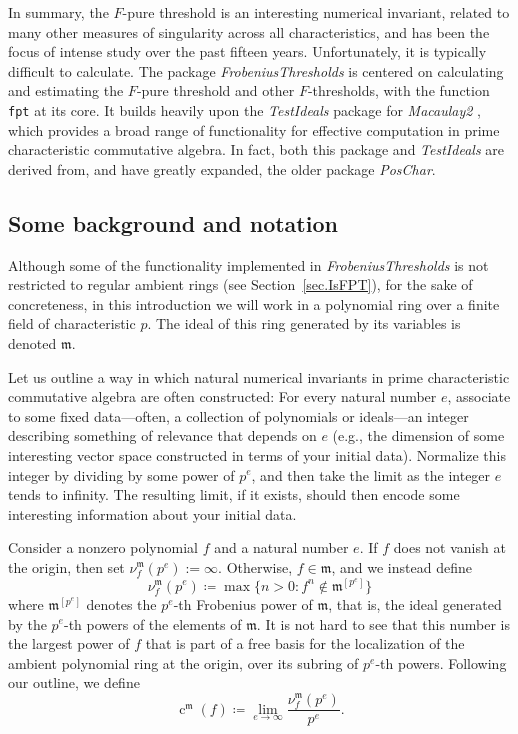 \documentclass{amsart}
\newcommand{\ft}{\operatorname{c}}
\newcommand{\idealm}{\mathfrak{m}}
\begin{document}
In summary,  the $F$-pure threshold is an interesting numerical invariant, related to many other measures of singularity across all characteristics, and has been the focus of intense study over the past fifteen years.
Unfortunately, it is typically difficult to calculate.
The package \emph{FrobeniusThresholds} is centered on calculating and estimating the $F$-pure threshold and other $F$-thresholds, with the function \texttt{fpt} at its core.
It builds heavily upon the \emph{TestIdeals} package for \emph{Macaulay2} \cite{TestIdealsPackage, TestIdealsPaper}, which provides a broad range of functionality for effective computation in prime characteristic commutative algebra.
In fact, both this package and \emph{TestIdeals} are derived from, and have greatly expanded, the older package \emph{PosChar}.

\subsection{Some background and notation}
Although some of the functionality implemented in \emph{FrobeniusThresholds} is not restricted to regular ambient rings (see Section~\ref{sec.IsFPT}), for the sake of concreteness, in this introduction  we will work in a polynomial ring over a finite field of  characteristic $p$.
The ideal of this ring generated by its variables is denoted $\idealm$.

Let us outline a way in which natural numerical invariants in prime characteristic commutative algebra are often constructed:  For every natural number $e$, associate to some fixed data---often, a collection of polynomials or ideals---an integer describing something of relevance that depends on $e$ (e.g., the dimension of some interesting vector space constructed in terms of your initial data).
Normalize this integer by dividing by some power of $p^e$, and then take the limit as the integer $e$ tends to infinity.
The resulting limit, if it exists, should then encode some interesting information about your initial data.

Consider a nonzero polynomial $f$ and a natural number $e$.  If $f$ does not vanish at the origin, then set $\nu_f^{\idealm}(p^e) := \infty$.  Otherwise, $f \in \idealm$, and we instead define
\[ \nu_f^{\idealm}(p^e) \coloneqq  \max \{ n>0 : f^n \notin \idealm^{[p^e]} \} \]
where $\idealm^{[p^e]}$ denotes the $p^e$-th Frobenius power of $\idealm$, that is, the ideal generated by the $p^e$-th powers of the elements of $\idealm$.
It is not hard to see that this number is the largest power of $f$ that is part of a free basis for the localization of the ambient polynomial ring at the origin, over its subring of $p^e$-th powers.
Following our outline, we define
\[ \ft^{\idealm}(f) \coloneqq  \lim_{e \to \infty} \frac{ \nu_f^{\idealm}(p^e)}{p^e}. \]
\end{document}
